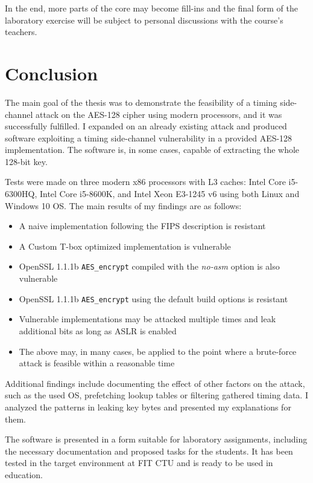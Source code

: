 \documentclass[thesis=B,english]{FITthesis}[2019/03/06]
\begin{document}
In the end, more parts of the core may become fill-ins and the final form of the laboratory exercise will be subject to personal discussions with the course's teachers.


\chapter{Conclusion}
The main goal of the thesis was to demonstrate the feasibility of a timing side-channel attack on the AES-128 cipher using modern processors, and it was successfully fulfilled.
I expanded on an already existing attack and produced software exploiting a timing side-channel vulnerability in a provided AES-128 implementation.
The software is, in some cases, capable of extracting the whole 128-bit key.

Tests were made on three modern x86 processors with L3 caches: Intel Core i5-6300HQ, Intel Core i5-8600K, and Intel Xeon E3-1245 v6 using both Linux and Windows 10 OS.
The main results of my findings are as follows:
\begin{itemize}
	\item A naive implementation following the FIPS description is resistant
	\item A Custom T-box optimized implementation is vulnerable
	\item OpenSSL 1.1.1b \verb'AES_encrypt' compiled with the \textit{no-asm} option is also vulnerable
	\item OpenSSL 1.1.1b \verb'AES_encrypt' using the default build options is resistant
	\item Vulnerable implementations may be attacked multiple times and leak additional bits as long as ASLR is enabled
	\item The above may, in many cases, be applied to the point where a brute-force attack is feasible within a reasonable time
\end{itemize}

Additional findings include documenting the effect of other factors on the attack, such as the used OS, prefetching lookup tables or filtering gathered timing data.
I analyzed the patterns in leaking key bytes and presented my explanations for them.

The software is presented in a form suitable for laboratory assignments, including the necessary documentation and proposed tasks for the students.
It has been tested in the target environment at FIT CTU and is ready to be used in education.
\end{document}

